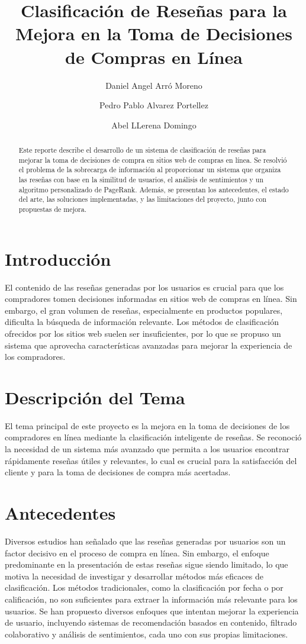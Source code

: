 \documentclass{llncs}
\title{Clasificación de Reseñas para la Mejora en la Toma de Decisiones de Compras en Línea}
\author{Daniel Angel Arró Moreno \and Pedro Pablo Alvarez Portellez \and Abel LLerena Domingo}
\institute{Facultad de Matemática y Computación, Universidad de La Habana, Cuba}
\begin{document}
	
	\maketitle
	
	\begin{abstract}
        Este reporte describe el desarrollo de un sistema de clasificación de reseñas para mejorar la toma de decisiones de compra en sitios web de compras en línea. Se resolvió el problema de la sobrecarga de información al proporcionar un sistema que organiza las reseñas con base en la similitud de usuarios, el análisis de sentimientos y un algoritmo personalizado de PageRank. Además, se presentan los antecedentes, el estado del arte, las soluciones implementadas, y las limitaciones del proyecto, junto con propuestas de mejora.
    \end{abstract}

    \section{Introducción}
    El contenido de las reseñas generadas por los usuarios es crucial para que los compradores tomen decisiones informadas en sitios web de compras en línea. Sin embargo, el gran volumen de reseñas, especialmente en productos populares, dificulta la búsqueda de información relevante. Los métodos de clasificación ofrecidos por los sitios web suelen ser insuficientes, por lo que se propuso un sistema que aprovecha características avanzadas para mejorar la experiencia de los compradores.

    \section{Descripción del Tema}
    El tema principal de este proyecto es la mejora en la toma de decisiones de los compradores en línea mediante la clasificación inteligente de reseñas. Se reconoció la necesidad de un sistema más avanzado que permita a los usuarios encontrar rápidamente reseñas útiles y relevantes, lo cual es crucial para la satisfacción del cliente y para la toma de decisiones de compra más acertadas.

    \section{Antecedentes}
    Diversos estudios han señalado que las reseñas generadas por usuarios son un factor decisivo en el proceso de compra en línea. Sin embargo, el enfoque predominante en la presentación de estas reseñas sigue siendo limitado, lo que motiva la necesidad de investigar y desarrollar métodos más eficaces de clasificación. Los métodos tradicionales, como la clasificación por fecha o por calificación, no son suficientes para extraer la información más relevante para los usuarios. Se han propuesto diversos enfoques que intentan mejorar la experiencia de usuario, incluyendo sistemas de recomendación basados en contenido, filtrado colaborativo y análisis de sentimientos, cada uno con sus propias limitaciones.
\end{document}
